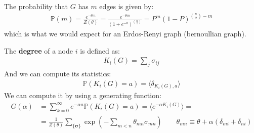 \documentclass[../../main.tex]{subfiles}
\begin{document}
\begin{exo}
    The probability that $G$ has $m$ edges is given by:
    \begin{align*}
        \mathbb{P}(m) = \frac{e^{-\theta m}}{Z(\theta)} = \frac{e^{-\theta m}}{(1 + e^{-\theta})^{{n\choose 2}}} = P^m (1-P)^{{n\choose 2} - m}
    \end{align*}%
    which is what we would expect for an Erdos-Renyi graph (bernoullian graph). %

    \medskip

    The \textbf{degree} of a node $i$ is defined as:
    \begin{align*}
        K_i(G) = \sum_{j} \sigma_{ij}
    \end{align*} 
    And we can compute its statistics:
    \begin{align*}
        \mathbb{P}(K_i(G) = a) = \langle \delta_{K_i(G),a} \rangle
    \end{align*}
    We can compute it by using a generating function:
    \begin{align*}
        G(\alpha) &= \sum_{k=0}^\infty e^{-\alpha a} \mathbb{P}(K_i(G) = a) = \langle e^{-\alpha K_i(G)} \rangle =\\
        &=\frac{1}{Z(\theta)} \sum_{\{\bm{\sigma}\}} \exp\left(-\sum_{m < n} \theta_{mn} \sigma_{mn}\right) \qquad \theta_{mn} \equiv \theta + \alpha (\delta_{mi} + \delta_{ni})
    \end{align*}


\end{exo}
\end{document}

